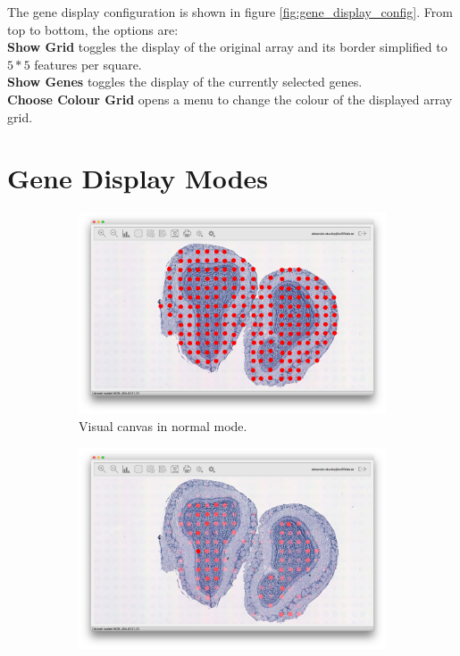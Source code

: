 \documentclass[10pt,a4paper,titlepage]{book}
\begin{document}
The gene display configuration is shown in figure \ref{fig:gene_display_config}. From top to bottom, the options are:\\
\textbf{Show Grid} toggles the display of the original array and its border simplified to $5*5$ features per square.\\
\textbf{Show Genes} toggles the display of the currently selected genes.\\
\textbf{Choose Colour Grid} opens a menu to change the colour of the displayed array grid.\\

\section{Gene Display Modes}

\begin{figure}[h]
	\centering
	\begin{subfigure}{0.3\linewidth}
		\includegraphics[width=\linewidth]{./Pictures/vc_normal}
		\caption{Visual canvas in normal mode.}
		\label{fig:vc_normal}
	\end{subfigure}
	\begin{subfigure}{0.3\linewidth}
		\includegraphics[width=\linewidth]{./Pictures/vc_dynamic}

\end{subfigure}
\end{figure}
\end{document}
